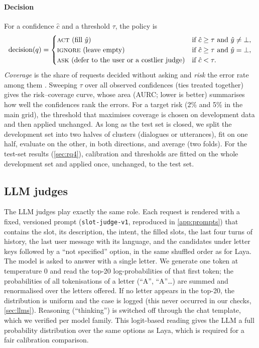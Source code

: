 \paragraph{Decision} For a confidence $\hat c$ and a threshold $\tau$, the policy is
\begin{equation}
  \text{decision}(q) =
  \begin{cases}
    \textsc{act} \ (\text{fill } \hat y) & \text{if } \hat c \ge \tau \text{ and } \hat y \neq \bot,\\
    \textsc{ignore} \ (\text{leave empty}) & \text{if } \hat c \ge \tau \text{ and } \hat y = \bot,\\
    \textsc{ask} \ (\text{defer to the user or a costlier judge}) & \text{if } \hat c < \tau.
  \end{cases}
\end{equation}
\emph{Coverage} is the share of requests decided without asking and \emph{risk} the error rate among them \citep{geifman2017selective}. Sweeping $\tau$ over all observed confidences (ties treated together) gives the risk--coverage curve, whose area (AURC; lower is better) summarises how well the confidences rank the errors. For a target risk (2\% and 5\% in the main grid), the threshold that maximises coverage is chosen on development data and then applied unchanged. As long as the test set is closed, we split the development set into two halves of clusters (dialogues or utterances), fit on one half, evaluate on the other, in both directions, and average (two folds). For the test-set results (\cref{sec:rq4}), calibration and thresholds are fitted on the whole development set and applied once, unchanged, to the test set.

\subsection{LLM judges}
\label{sec:llmjudge}

The LLM judges play exactly the same role. Each request is rendered with a fixed, versioned prompt (\texttt{slot-judge-v1}, reproduced in \cref{app:prompts}) that contains the slot, its description, the intent, the filled slots, the last four turns of history, the last user message with its language, and the candidates under letter keys followed by a ``not specified'' option, in the same shuffled order as for Laya. The model is asked to answer with a single letter. We generate one token at temperature 0 and read the top-20 log-probabilities of that first token; the probabilities of all tokenisations of a letter (``A'', ``\textvisiblespace A''\ldots) are summed and renormalised over the letters offered. If no letter appears in the top-20, the distribution is uniform and the case is logged (this never occurred in our checks, \cref{sec:llms}). Reasoning (``thinking'') is switched off through the chat template, which we verified per model family. This logit-based reading gives the LLM a full probability distribution over the same options as Laya, which is required for a fair calibration comparison.
